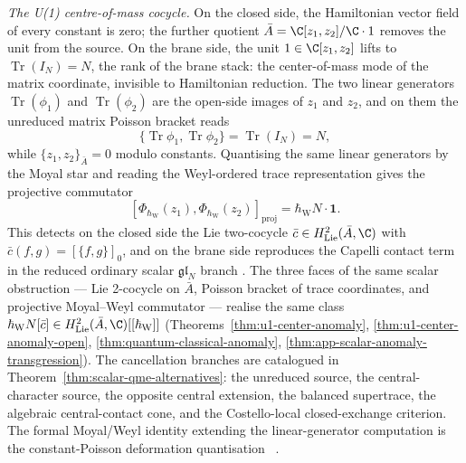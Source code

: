 \documentclass[11pt]{memoir}
\begin{document}
\medskip\noindent
\emph{The U(1) centre-of-mass cocycle.}  On the closed side, the
Hamiltonian vector field of every constant is zero; the further
quotient \(\bar A=\C[z_1,z_2]/\C\cdot1\) removes the unit from the
source.  On the brane side, the unit \(1\in\C[z_1,z_2]\) lifts to
\(\operatorname{Tr}(I_N)=N\), the rank of the brane stack: the
center-of-mass mode of the matrix coordinate, invisible to Hamiltonian
reduction.  The two linear generators
\(\operatorname{Tr}(\phi_1)\) and \(\operatorname{Tr}(\phi_2)\) are
the open-side images of \(z_1\) and \(z_2\), and on them the
unreduced matrix Poisson bracket reads
\[
  \{\operatorname{Tr}\phi_1,\operatorname{Tr}\phi_2\}
   = \operatorname{Tr}(I_N) = N,
\]
while \(\{z_1,z_2\}_{\bar A}=0\) modulo constants.  Quantising the
same linear generators by the Moyal star and reading the
Weyl-ordered trace representation gives the projective commutator
\[
  [\Phi_{\hbar_{\mathrm{W}}}(z_1),
   \Phi_{\hbar_{\mathrm{W}}}(z_2)]_{\mathrm{proj}}
   =\hbar_{\mathrm{W}}N\cdot\mathbf 1 .
\]
This detects on the closed side the Lie two-cocycle
\(\bar c\in H^2_{\mathrm{Lie}}(\bar A,\C)\) with
\(\bar c(f,g)=[\{f,g\}]_0\), and on the brane side reproduces the
Capelli contact term in the reduced ordinary scalar
\(\mathfrak{gl}_N\) branch
\cite{capelli}\cite{howe-capelli}.  The three faces of the same scalar
obstruction --- Lie 2-cocycle on $\bar A$, Poisson bracket of trace
coordinates, and projective Moyal--Weyl commutator --- realise the same
class
\(\hbar_{\mathrm{W}}N[\bar c]\in
H^2_{\mathrm{Lie}}(\bar A,\C)[[\hbar_{\mathrm{W}}]]\)
(Theorems~\ref{thm:u1-center-anomaly},
\ref{thm:u1-center-anomaly-open},
\ref{thm:quantum-classical-anomaly},
\ref{thm:app-scalar-anomaly-transgression}).  The cancellation
branches are catalogued in
Theorem~\ref{thm:scalar-qme-alternatives}: the unreduced source, the
central-character source, the opposite central extension, the
balanced supertrace, the algebraic central-contact cone, and the
	Costello-local closed-exchange criterion.  The formal Moyal/Weyl
identity extending the linear-generator computation is the
constant-Poisson deformation quantisation
~\cite{kontsevich-dq}\cite{cattaneo-felder-bv}.
\end{document}
